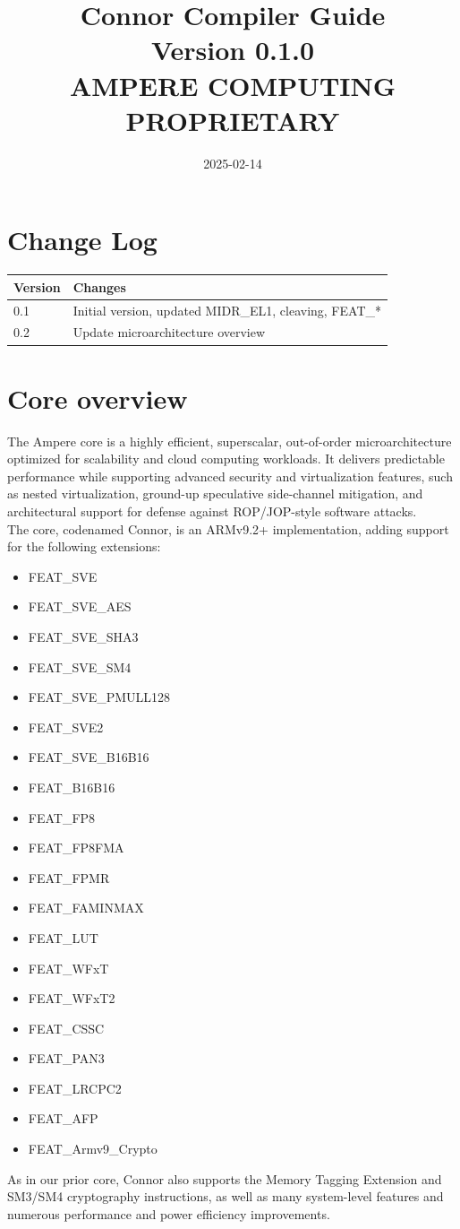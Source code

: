 \documentclass{article}
\title{Connor Compiler Guide \\ Version 0.1.0\\ AMPERE COMPUTING PROPRIETARY}
\date{2025-02-14}
\begin{document}
\maketitle

\tableofcontents
\newpage
\listoftables
\newpage
\section{Change Log}
\begin{longtable}{|l|p{4in}|}
  \hline
  {\bf Version} & {\bf Changes} \\ \hline
  \hline
  \endfirsthead
  0.1 & Initial version, updated MIDR\_EL1, cleaving, FEAT\_* \\ \hline
  0.2 & Update microarchitecture overview \\ \hline
\end{longtable}
\newpage
\section{Core overview}

The Ampere core is a highly efficient, superscalar, out-of-order
microarchitecture optimized for scalability and cloud computing
workloads. It delivers predictable performance while supporting
advanced security and virtualization features, such as nested
virtualization, ground-up speculative side-channel mitigation, and
architectural support for defense against ROP/JOP-style software
attacks. \\

The core, codenamed Connor, is an ARMv9.2+ implementation, adding
support for the following extensions:
\begin{itemize}
\item FEAT\_SVE
\item FEAT\_SVE\_AES
\item FEAT\_SVE\_SHA3
\item FEAT\_SVE\_SM4
\item FEAT\_SVE\_PMULL128
\item FEAT\_SVE2
\item FEAT\_SVE\_B16B16
\item FEAT\_B16B16
\item FEAT\_FP8
\item FEAT\_FP8FMA
\item FEAT\_FPMR
\item FEAT\_FAMINMAX
\item FEAT\_LUT
\item FEAT\_WFxT
\item FEAT\_WFxT2
\item FEAT\_CSSC
\item FEAT\_PAN3
\item FEAT\_LRCPC2
\item FEAT\_AFP
\item FEAT\_Armv9\_Crypto
\end{itemize}
As in our prior core, Connor
also supports the Memory Tagging Extension and SM3/SM4 cryptography
instructions, as well as many system-level features and numerous
performance and power efficiency improvements. \\
\end{document}
